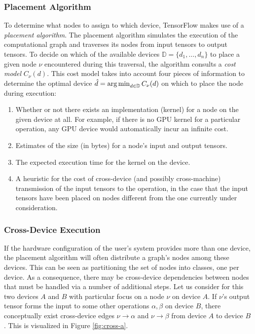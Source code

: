 \subsubsection{Placement Algorithm}\label{sec:model-exec-placement}

To determine what nodes to assign to which device, TensorFlow makes use of a
\emph{placement algorithm}. The placement algorithm simulates the execution of
the computational graph and traverses its nodes from input tensors to output
tensors. To decide on which of the available devices
$\mathbb{D} = \{d_1, \dots, d_n\}$ to place a given node $\nu$ encountered
during this traversal, the algorithm consults a \emph{cost model}
$C_\nu(d)$. This cost model takes into account four pieces of information to
determine the optimal device $\hat{d} = \operatorname*{arg\,min}_{d \in \mathbb{D}} C_\nu(d)$ on
which to place the node during execution:

\begin{enumerate}
  \item Whether or not there exists an implementation (kernel) for a node on the
    given device at all. For example, if there is no GPU kernel for a particular
    operation, any GPU device would automatically incur an infinite cost.
  \item Estimates of the size (in bytes) for a node's input and output tensors.
  \item The expected execution time for the kernel on the device.
  \item A heuristic for the cost of cross-device (and possibly cross-machine)
    transmission of the input tensors to the operation, in the case that the
    input tensors have been placed on nodes different from the one currently
    under consideration.
\end{enumerate}

\subsubsection{Cross-Device Execution}\label{sec:model-exec-single}

If the hardware configuration of the user's system provides more than one
device, the placement algorithm will often distribute a graph's nodes among
these devices. This can be seen as partitioning the set of nodes into classes,
one per device. As a consequence, there may be cross-device dependencies between
nodes that must be handled via a number of additional steps. Let us consider for
this two devices $A$ and $B$ with particular focus on a node $\nu$ on device
$A$. If $\nu$'s output tensor forms the input to some other operations
$\alpha, \beta$ on device $B$, there conceptually exist cross-device edges
$\nu \rightarrow \alpha$ and $\nu \rightarrow \beta$ from device $A$ to device
$B$. This is visualized in Figure \ref{fig:cross-a}.

